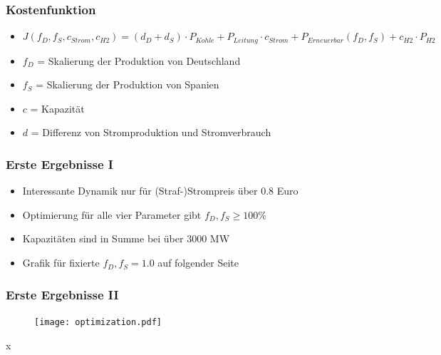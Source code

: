 \documentclass[aspectratio=169,t]{beamer}
\begin{document}
	\begin{frame}
		\frametitle{Kostenfunktion}
		\vspace*{2mm}
			\begin{minipage}{1\linewidth}
			\begin{minipage}{1\linewidth}
				\begin{itemize}
					\item \begin{math}
						J(f_D, f_S, c_{Strom}, c_{H2}) = (d_D + d_S) \cdot P_{Kohle} + P_{Leitung} \cdot c_{Strom} + P_{Erneuerbar}(f_D, f_S) + c_{H2} \cdot P_{H2}
					\end{math}
					\item 
					$	f_D$ = Skalierung der Produktion von Deutschland
					
					\item 
						$f_S$ = Skalierung der Produktion von Spanien
					\item 
					$	c$ = Kapazität
					\item 
					$	d$ = Differenz von Stromproduktion und  Stromverbrauch
				
					
				\end{itemize}
			\end{minipage}
			\hfill
			\begin{minipage}{.1\linewidth}
				\centering
				
			\end{minipage}
		\end{minipage}	
	
			
	\end{frame}


\begin{frame}
	\frametitle{Erste Ergebnisse I}
	\begin{itemize}
		\item Interessante Dynamik nur für (Straf-)Strompreis über 0.8 Euro
		\item Optimierung für alle vier Parameter gibt $f_D, f_S \geq 100\%$
		\item Kapazitäten sind in Summe bei über $3000$ MW
		\item Grafik für fixierte $f_D, f_S = 1.0$ auf folgender Seite
	\end{itemize}
	\vspace*{-2cm}
\end{frame}

\begin{frame}
	\frametitle{Erste Ergebnisse II}
	\vspace*{-1.6cm}
	\begin{figure}
		\hspace*{3.5cm}\texttt{[image: optimization.pdf]}
	\end{figure}x
\end{frame}
\end{document}
